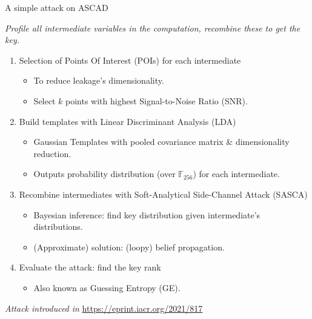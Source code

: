 \documentclass[aspectratio=169]{beamer}
\begin{document}
\begin{frame}{A simple attack on ASCAD}
    \begin{center}
        \emph{Profile all intermediate variables in the computation, recombine these to get the key.}
    \end{center}
    \pause

    \begin{enumerate}[<+->]
        \item Selection of Points Of Interest (POIs) for each intermediate
            \begin{itemize}[<.->]
                \item To reduce leakage's dimensionality.
                \item Select $k$ points with highest Signal-to-Noise Ratio (SNR).
            \end{itemize}
        \item Build templates with Linear Discriminant Analysis (LDA)
            \begin{itemize}[<.->]
                \item Gaussian Templates with pooled covariance matrix \& dimensionality reduction.
                \item Outputs probability distribution (over $\mathbb{F}_{256}$) for each intermediate.
            \end{itemize}
        \item Recombine intermediates with Soft-Analytical Side-Channel Attack (SASCA)
            \begin{itemize}[<.->]
                \item Bayesian inference: find key distribution given intermediate's distributions.
                \item (Approximate) solution: (loopy) belief propagation.
            \end{itemize}
        \item Evaluate the attack: find the key rank
            \begin{itemize}[<.->]
                \item Also known as Guessing Entropy (GE).
            \end{itemize}
    \end{enumerate}
    \pause

    \textit{Attack introduced in} \url{https://eprint.iacr.org/2021/817}
\end{frame}
\end{document}
